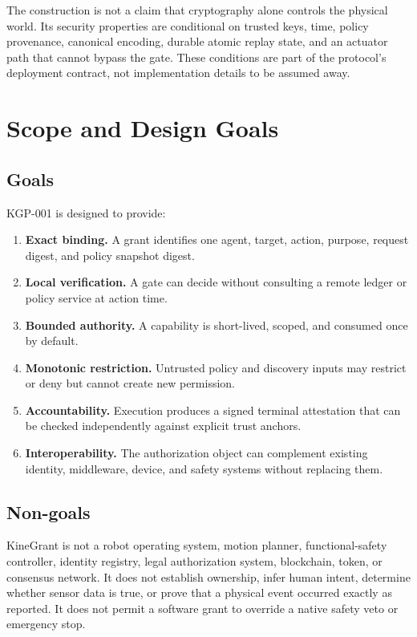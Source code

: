 \documentclass[10.5pt,a4paper]{article}
\begin{document}
The construction is not a claim that cryptography alone controls the physical world. Its
security properties are conditional on trusted keys, time, policy provenance, canonical
encoding, durable atomic replay state, and an actuator path that cannot bypass the gate. These
conditions are part of the protocol's deployment contract, not implementation details to be
assumed away.

\section{Scope and Design Goals}

\subsection{Goals}

KGP-001 is designed to provide:

\begin{enumerate}
  \item \textbf{Exact binding.} A grant identifies one agent, target, action, purpose,
  request digest, and policy snapshot digest.
  \item \textbf{Local verification.} A gate can decide without consulting a remote ledger
  or policy service at action time.
  \item \textbf{Bounded authority.} A capability is short-lived, scoped, and consumed once
  by default.
  \item \textbf{Monotonic restriction.} Untrusted policy and discovery inputs may restrict
  or deny but cannot create new permission.
  \item \textbf{Accountability.} Execution produces a signed terminal attestation that can
  be checked independently against explicit trust anchors.
  \item \textbf{Interoperability.} The authorization object can complement existing identity,
  middleware, device, and safety systems without replacing them.
\end{enumerate}

\subsection{Non-goals}

KineGrant is not a robot operating system, motion planner, functional-safety controller,
identity registry, legal authorization system, blockchain, token, or consensus network. It
does not establish ownership, infer human intent, determine whether sensor data is true, or
prove that a physical event occurred exactly as reported. It does not permit a software grant
to override a native safety veto or emergency stop.
\end{document}

